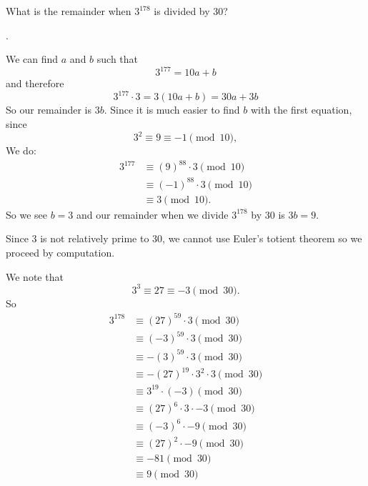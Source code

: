 \documentclass[11pt]{article}
\begin{document}
\begin{problem}What is the remainder when $3^{178}$ is divided by 30?
\end{problem}
\begin{answer}
.
\end{answer}
\begin{solutionone}
We can find $a$ and $b$ such that
$$3^{177} = 10a+b$$
and therefore
$$3^{177} \cdot 3 = 3(10a+b) = 30a+3b$$
So our remainder is $3b$. Since it is much easier to find $b$ with the first equation, since
$$3^2 \equiv 9 \equiv -1 \pmod{10},$$
We do:
\begin{align*}
3^{177} &\equiv (9)^{88} \cdot 3  \pmod{10} \\
&\equiv (-1)^{88} \cdot 3 \pmod{10} \\
&\equiv 3 \pmod{10}.
\end{align*}
So we see $b=3$ and our remainder when we divide $3^{178}$ by 30 is $3b = \boxed{9}$.
\end{solutionone}
\begin{solutiontwo}
Since 3 is not relatively prime to 30, we cannot use Euler's totient theorem so we proceed by computation. \par
We note that
$$3^3 \equiv 27 \equiv -3 \pmod{30}.$$
So
\begin{align*}
3^{178} &\equiv (27)^{59} \cdot 3 \pmod{30} \\
&\equiv (-3)^{59} \cdot 3 \pmod{30}\\
&\equiv -(3)^{59} \cdot 3 \pmod{30}\\
&\equiv -(27)^{19} \cdot 3^2 \cdot 3 \pmod{30}\\
&\equiv 3^{19} \cdot (-3) \pmod{30}\\
&\equiv (27)^6 \cdot 3 \cdot -3  \pmod{30}\\
&\equiv (-3)^6 \cdot -9 \pmod{30}\\
&\equiv (27)^2 \cdot -9 \pmod{30}\\
&\equiv -81 \pmod{30}\\
&\equiv \boxed{9} \pmod{30}\\
\end{align*}
\end{solutiontwo}
\end{document}

